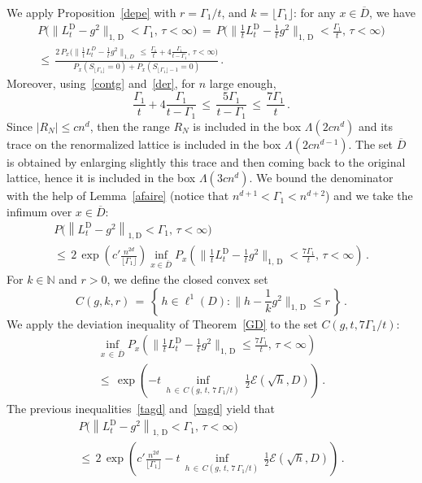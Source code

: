 \documentclass[AHL, Unicode, longabstracts, published]{cedram}
\newcommand*\bD{\overline{D}}
\newcommand*\tD{\mathrm{D}}%
\newcommand*\N {{\mathbb N}}
\newcommand*\La {{\Lambda}}
\newcommand{\cE}{\mathcal{E}}
\renewcommand{\N}{\mathbb{N}}
\begin{document}
We apply Proposition~\ref{depe} with $r=\Gamma_1/t$, and $k=\lfloor\Gamma_1\rfloor$: for any $x\in\bD$, we have
\begin{multline*}
P\big(\|L_t^{\tD}-g^2\|_{1,\,\tD}<\Gamma_1,\,\tau<\infty
\big)\,=\, P\Big(
\Big\|\frac{1}{t}L_t^{\tD}-\frac{1}{t}g^2\Big\|_{1,\,\tD}<
\frac{\Gamma_1}{t},\,\tau<\infty
\Big)\\
\leq\,
\frac{\displaystyle 2\, P_x\Big(
\Big\|\frac{1}{t}L_t^D-
\frac{1}{t}g^2
\Big\|_{1,D}\,\leq\,
\frac{\Gamma_1}{t} +4\frac{\Gamma_1}{t-\Gamma_1},\,\tau<\infty
\Big)} {\displaystyle P_x(S_{
\lfloor\Gamma_1\rfloor }=0)+ P_x(S_{
\lfloor\Gamma_1\rfloor -1}=0)}\,.
\end{multline*}
Moreover, using~\eqref{contg} and~\eqref{der}, for $n$ large enough,
\[
\frac{\Gamma_1}{t} +4\frac{\Gamma_1}{t-\Gamma_1}\,\leq\,
\frac{5\Gamma_1}{t-\Gamma_1}
\,\leq\, \frac{7\Gamma_1}{t}
\,.
\]
Since $|R_N|\leq cn^d$, then the range $R_N$ is included in the box $\La(2cn^d)$ and its trace on the renormalized lattice is included in the box $\La(2cn^{d-1})$. The set $\bD$ is obtained by enlarging slightly this trace and then coming back to the original lattice, hence it is included in the box $\La(3cn^{d})$. We bound the denominator with the help of Lemma~\ref{afaire} (notice that $n^{d+1}<\Gamma_1<n^{d+2}$) and we take the infimum over $x\in\bD$:
\begin{multline}\label{tagd}
P\big(\left\|L_t^{\tD}-g^2
\right\|_{1,\tD}<\Gamma_1,\,\tau<\infty
\big)
\\
\leq \,2 \,\exp\left(c'\frac{n^{2d}}{\lfloor\Gamma_1\rfloor}\right)
\inf_{x\in \bD} P_x\left(
\Big\|\frac{1}{t}L_t^{\tD}-\frac{1}{t}g^2\Big\|_{1,\,\tD}<
\frac{7\Gamma_1}{t},\,\tau<\infty
\right)\,.
\end{multline}
For $k\in\N$ and $r>0$, we define the closed convex set
\[
C(g,k,r)\,=\,\left\{\,
h\in\ell^1(D):
\Big\|h-\frac{1}{k}g^2\Big\|_{1,\,\tD}\leq r
\,\right\}\,.
\]
We apply the deviation inequality of Theorem~\ref{GD} to the set $C(g,t, {7\Gamma_1}/{t})$:
\begin{multline}\label{vagd}
\inf_{x\,\in\,\bD} P_x\left(
\Big\|\frac{1}{t}L_t^{\tD}-\frac{1}{t}g^2\Big\|_{1,\,\tD}\leq\frac{7\Gamma_1}{t},\,\tau<\infty\right)\\
\leq\,\exp\left(-t\,\inf_{h\,\in\,C(g,\,t,\, {7\,\Gamma_1}/{t}) }\,\frac{1}{2}\cE(\sqrt{h},D) \right)
\,.
\end{multline}
The previous inequalities~\eqref{tagd} and~\eqref{vagd} yield that
\begin{multline}\label{agd}
P\big(\left\|L_t^{\tD}-g^2\right\|_{1,\,\tD}<\Gamma_1,\,\tau<\infty\big)\\
\leq\, 2 \, \exp\left(c'\frac{n^{2d}}{\lfloor\Gamma_1\rfloor} -t\,\inf_{h\,\in\,C(g,\,t,\, {7\,\Gamma_1}/{t}) }\,\frac{1}{2}\cE(\sqrt{h},D) \right)
\,.
\end{multline}
\end{document}
